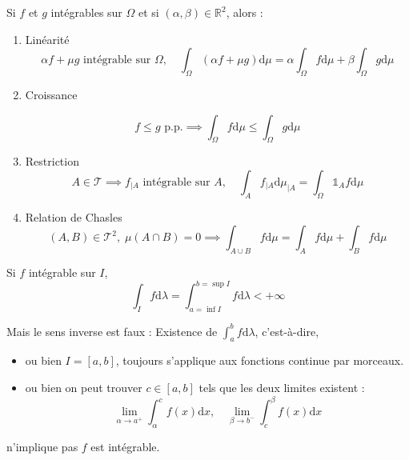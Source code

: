\begin{Prop}{}{}
  Si $f$ et $g$ intégrables sur $\Omega$ et si $(\alpha, \beta) \in \mathbb{R} ^{2}$, alors : 
\begin{enumerate}


    \item Linéarité  
  \begin{equation}
    \alpha f+\mu g \text{ intégrable sur }\Omega,\quad \int_{\Omega}^{} (\alpha f + \mu g) \mathrm{d} \mu = \alpha \int_{\Omega}^{} f \mathrm{d} \mu + \beta \int_{\Omega}^{} g \mathrm{d}\mu
  \end{equation}
    \item Croissance  

      \begin{equation}
        f \le g \text{ p.p.} \implies \int_{\Omega}^{} f \mathrm{d}\mu \le \int_{\Omega}^{} g \mathrm{d}\mu
      \end{equation}

    \item Restriction 
      \begin{equation}
        A \in \mathcal{T} \implies f _{|A} \text{ intégrable sur } A, \quad \int_{A}^{} f _{|A}  \mathrm{d} \mu _{|A} = \int_{\Omega}^{} \mathbb{1} _A f \mathrm{d}\mu
      \end{equation}
    \item Relation de Chasles
      \begin{equation}
        (A, B) \in \mathcal{T} ^{2}, \; \mu(A \cap B) = 0 \implies \int_{A \cup B}^{} f \mathrm{d}\mu = \int_{A}^{} f \mathrm{d}\mu + \int_{B}^{} f \mathrm{d}\mu
      \end{equation}

\end{enumerate}
\end{Prop}


\begin{Prop}{}{}
Si $f$ intégrable sur $I$, 
\begin{equation}
  \int_{I}^{} f\mathrm{d}\lambda = \int_{a = \inf I}^{b = \sup I} f \mathrm{d}\lambda < + \infty
\end{equation}

Mais le sens inverse est faux : Existence de $\int_{a}^{b} f \mathrm{d}\lambda$, c'est-à-dire, 
\begin{itemize}

  \item ou bien $I= [a,b]$, toujours s'applique aux fonctions continue par morceaux.
  \item ou bien on peut trouver $c \in [a,b]$ tels que les deux limites existent : 
\begin{equation}
  \underset{\alpha \to a ^{+}}{\lim} \int_{\alpha}^{c} f(x) \mathrm{d}x , \quad \underset{\beta \to b ^{-}}{\lim} \int_{c}^{\beta} f(x) \mathrm{d}x
\end{equation}

\end{itemize}
n'implique pas $f$ est intégrable.
\end{Prop}



